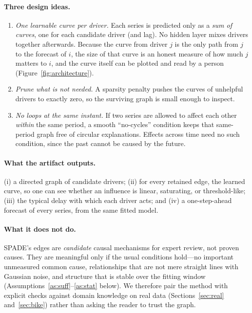 \paragraph{Three design ideas.}
\begin{enumerate}[leftmargin=1.6em,itemsep=2pt]
    \item \emph{One learnable curve per driver.} Each series is predicted only as a
    \emph{sum of curves}, one for each candidate driver (and lag). No hidden layer
    mixes drivers together afterwards. Because the curve from driver $j$ is the only
    path from $j$ to the forecast of $i$, the size of that curve is an honest
    measure of how much $j$ matters to $i$, and the curve itself can be plotted and
    read by a person (Figure~\ref{fig:architecture}).
    \item \emph{Prune what is not needed.} A sparsity penalty pushes the curves of
    unhelpful drivers to exactly zero, so the surviving graph is small enough to
    inspect.
    \item \emph{No loops at the same instant.} If two series are allowed to affect
    each other \emph{within} the same period, a smooth ``no-cycles'' condition keeps
    that same-period graph free of circular explanations. Effects across time need
    no such condition, since the past cannot be caused by the future.
\end{enumerate}

\paragraph{What the artifact outputs.} (i) a directed graph of candidate drivers;
(ii) for every retained edge, the learned curve, so one can see whether an
influence is linear, saturating, or threshold-like; (iii) the typical delay with
which each driver acts; and (iv) a one-step-ahead forecast of every series, from
the same fitted model.

\paragraph{What it does not do.} SPADE's edges are \emph{candidate} causal
mechanisms for expert review, not proven causes. They are meaningful only if the
usual conditions hold---no important unmeasured common cause, relationships that
are not mere straight lines with Gaussian noise, and structure that is stable
over the fitting window (Assumptions~\ref{as:suff}--\ref{as:stat} below). We
therefore pair the method with explicit checks against domain knowledge on real
data (Sections~\ref{sec:real} and~\ref{sec:bike}) rather than asking the reader to
trust the graph.

